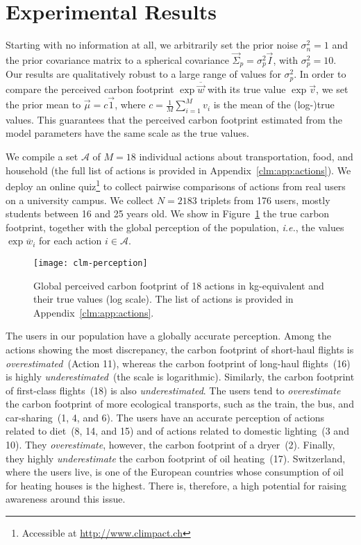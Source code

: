 \section{Experimental Results}
\label{clm:sec:results}

Starting with no information at all, we arbitrarily set the prior noise $\sigma_n^{2} = 1$ and the prior covariance matrix to a spherical covariance $\vec{\Sigma}_p = \sigma_p^{2} \vec{I}$, with $\sigma_p^{2} = 10$.
Our results are qualitatively robust to a large range of values for $\sigma_p^{2}$.
In order to compare the perceived carbon footprint $\exp \overline{\vec{w}}$ with its true value $\exp \vec{v}$, we set the prior mean to $\vec{\mu} = c \vec{1}$, where $ c = \frac{1}{M}\sum_{i=1}^M v_i$ is the mean of the (log-)true values.
This guarantees that the perceived carbon footprint estimated from the model parameters have the same scale as the true values.

We compile a set $\mathcal{A}$ of $M=18$ individual actions about transportation, food, and household (the full list of actions is provided in Appendix~\ref{clm:app:actions}).
We deploy an online quiz\footnote{Accessible at \url{http://www.climpact.ch}} to collect pairwise comparisons of actions from real users on a university campus.
We collect $N=2183$ triplets from 176 users, mostly students between 16 and 25 years old.
We show in Figure~\ref{clm:fig:perception} the true carbon footprint, together with the global perception of the population, \textit{i.e.}, the values $\exp \overline{w}_i$ for each action $i \in \mathcal{A}$.

\begin{figure}
	\centering
	\texttt{[image: clm-perception]}
	\caption{Global perceived carbon footprint of 18 actions in kg\COtwo-equivalent and their true values (log scale).
		The list of actions is provided in Appendix~\ref{clm:app:actions}.}%
	\label{clm:fig:perception}
\end{figure}

The users in our population have a globally accurate perception.
Among the actions showing the most discrepancy, the carbon footprint of short-haul flights is \textit{overestimated}~(Action 11), whereas the carbon footprint of long-haul flights~(16) is highly \textit{underestimated}~(the scale is logarithmic).
Similarly, the carbon footprint of first-class flights~(18) is also \textit{underestimated}.
The users tend to \textit{overestimate} the carbon footprint of more ecological transports, such as the train, the bus, and car-sharing~(1, 4, and 6).
The users have an accurate perception of actions related to diet~(8, 14, and 15) and of actions related to domestic lighting~(3 and 10).
They \textit{overestimate}, however, the carbon footprint of a dryer~(2).
Finally, they highly \textit{underestimate} the carbon footprint of oil heating~(17).
Switzerland, where the users live, is one of the European countries whose consumption of oil for heating houses is the highest.
There is, therefore, a high potential for raising awareness around this issue.
